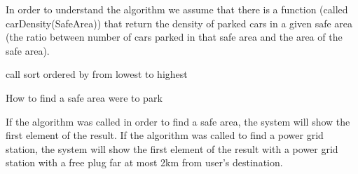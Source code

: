 In order to understand the algorithm we assume that there is a function (called carDensity(SafeArea)) that return the density of parked cars in a given safe area (the ratio between number of cars parked in that safe area and the area of the safe area).

\BlankLine

\begin{algorithm}[H]


	\BlankLine
	
call \;
sort \SAS ordered by \cd{\SA} from lowest to highest\;
\Return \Res \;
\caption{How to find a safe area were to park}
\end{algorithm}
\BlankLine
\BlankLine
\BlankLine
If the algorithm was called in order to find a safe area, the system will show the first element of the result. If the algorithm was called to find a power grid station, the system will show the first element of the result with a power grid station with a free plug far at most 2km from user's destination.
